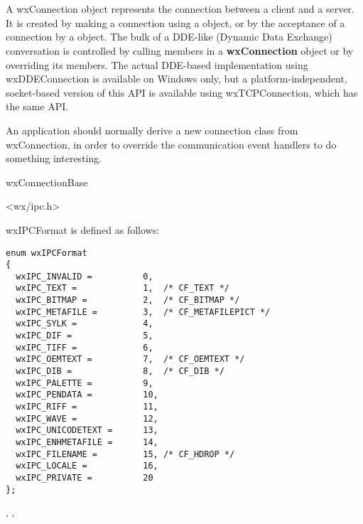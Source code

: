 \section{}\label{wxconnection}

A wxConnection object represents the connection between a client
and a server. It is created by making a connection using a\rtfsp
{} object, or by the acceptance of a
connection by a\rtfsp {} object. The
bulk of a DDE-like (Dynamic Data Exchange) conversation is
controlled by calling members in a {\bf wxConnection} object or
by overriding its members. The actual DDE-based implementation
using wxDDEConnection is available on Windows only, but a
platform-independent, socket-based version of this API is
available using wxTCPConnection, which has the same API.

An application should normally derive a new connection class from
wxConnection, in order to override the communication event
handlers to do something interesting.


wxConnectionBase\\


<wx/ipc.h>


wxIPCFormat is defined as follows:

\begin{verbatim}
enum wxIPCFormat
{
  wxIPC_INVALID =          0,
  wxIPC_TEXT =             1,  /* CF_TEXT */
  wxIPC_BITMAP =           2,  /* CF_BITMAP */
  wxIPC_METAFILE =         3,  /* CF_METAFILEPICT */
  wxIPC_SYLK =             4,
  wxIPC_DIF =              5,
  wxIPC_TIFF =             6,
  wxIPC_OEMTEXT =          7,  /* CF_OEMTEXT */
  wxIPC_DIB =              8,  /* CF_DIB */
  wxIPC_PALETTE =          9,
  wxIPC_PENDATA =          10,
  wxIPC_RIFF =             11,
  wxIPC_WAVE =             12,
  wxIPC_UNICODETEXT =      13,
  wxIPC_ENHMETAFILE =      14,
  wxIPC_FILENAME =         15, /* CF_HDROP */
  wxIPC_LOCALE =           16,
  wxIPC_PRIVATE =          20
};
\end{verbatim}


, ,

